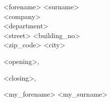 
\begin{letter}{
    <forename> <surname>\\
    <company>\\
    <department>\\
    <street> <building\_no>\\
    <zip\_code> <city>
}

\opening{<opening>,}

\lipsum[4]
\lipsum[1]

<closing>,

<my\_forename> <my\_surname>

\end{letter}

